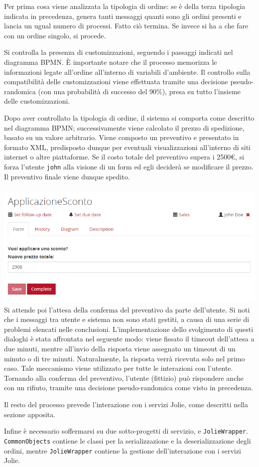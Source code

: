 Per prima cosa viene analizzata la tipologia di ordine: se \`e della
terza tipologia indicata in precedenza, genera tanti messaggi quanti
sono gli ordini presenti e lancia un ugual numero di processi. Fatto
ci\`o termina. Se invece si ha a che fare con un ordine singolo, si
procede.

Si controlla la presenza di customizzazioni, seguendo i passaggi
indicati nel diagramma BPMN. \`E importante notare che il processo
memorizza le informazioni legate all'ordine all'interno di variabili
d'ambiente. Il controllo sulla compatibilit\`a delle customizzazioni
viene effettuata tramite una decisione pseudo-randomica (con una
probabilit\`a di successo del 90\%), presa su tutto l'insieme delle
customizzazioni.

Dopo aver controllato la tipologia di ordine, il sistema si comporta
come descritto nel diagramma BPMN; successivamente viene calcolato il
prezzo di spedizione, basato su un valore arbitrario. Viene composto un
preventivo e presentato in formato XML, predisposto dunque per eventuali
visualizzazioni all'interno di siti internet o altre piattaforme. Se il
costo totale del preventivo supera i 2500\euro{}, si forza l'utente
{\tt john} alla visione di un form ed egli decider\`a se modificare il
prezzo. Il preventivo finale viene dunque spedito. \\\\
\includegraphics[scale=0.5]{immagini/formCamunda.png}\\
Si attende poi l'attesa della conferma del preventivo da parte
dell'utente. Si noti che i messaggi tra utente e sistema non sono stati
gestiti, a causa di una serie di problemi elencati nelle conclusioni.
L'implementazione dello svolgimento di questi dialoghi \`e stata
affrontata nel seguente modo: viene fissato il timeout dell'attesa a due
minuti, mentre all'invio della risposta viene assegnato un timeout di un
minuto o di tre minuti. Naturalmente, la risposta verr\`a ricevuta solo
nel primo caso.
Tale meccanismo viene utilizzato per tutte le interazioni con l'utente.
Tornando alla conferma del preventivo, l'utente (fittizio) pu\`o
rispondere anche con un rifiuto, tramite una decisione pseudo-randomica
come visto in precedenza.

Il resto del processo prevede l'interazione con i servizi Jolie, come
descritti nella sezione apposita.

Infine \`e necessario soffermarsi su due sotto-progetti di servizio,
 e {\tt JolieWrapper}. {\tt CommonObjects}
contiene le classi per la serializzazione e la deserializzazione degli
ordini, mentre {\tt JolieWrapper} contiene la gestione dell'interazione
con i servizi Jolie.
